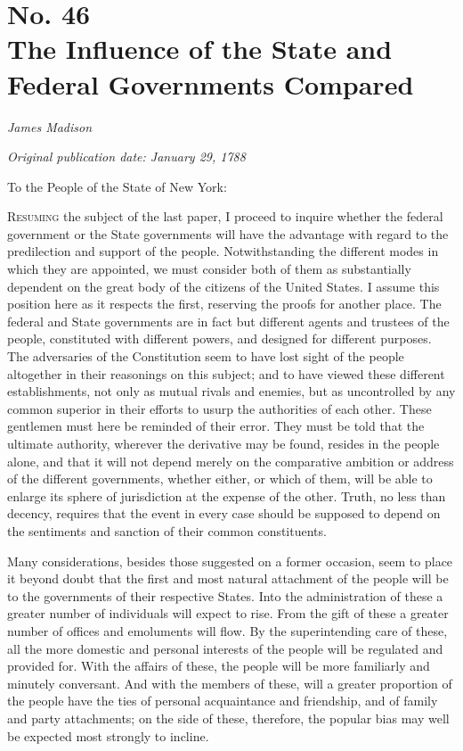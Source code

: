 \chapter[No. 46: The Influence of the State and Federal Governments Compared]{No. 46\\ {\small The Influence of the State and Federal Governments Compared}}

\textit{James Madison}

\textit{Original publication date: January 29, 1788}
\vspace{1cm}

To the People of the State of New York:
\vspace{.4cm}

\textsc{Resuming} the subject of the last paper, I proceed to inquire whether the federal government or the State governments will have the advantage with regard to the predilection and support of the people. 
Notwithstanding the different modes in which they are appointed, we must consider both of them as substantially dependent on the great body of the citizens of the United States. 
I assume this position here as it respects the first, reserving the proofs for another place. 
The federal and State governments are in fact but different agents and trustees of the people, constituted with different powers, and designed for different purposes. 
The adversaries of the Constitution seem to have lost sight of the people altogether in their reasonings on this subject; and to have viewed these different establishments, not only as mutual rivals and enemies, but as uncontrolled by any common superior in their efforts to usurp the authorities of each other. 
These gentlemen must here be reminded of their error. 
They must be told that the ultimate authority, wherever the derivative may be found, resides in the people alone, and that it will not depend merely on the comparative ambition or address of the different governments, whether either, or which of them, will be able to enlarge its sphere of jurisdiction at the expense of the other. 
Truth, no less than decency, requires that the event in every case should be supposed to depend on the sentiments and sanction of their common constituents.

Many considerations, besides those suggested on a former occasion, seem to place it beyond doubt that the first and most natural attachment of the people will be to the governments of their respective States. 
Into the administration of these a greater number of individuals will expect to rise. 
From the gift of these a greater number of offices and emoluments will flow. 
By the superintending care of these, all the more domestic and personal interests of the people will be regulated and provided for. 
With the affairs of these, the people will be more familiarly and minutely conversant. 
And with the members of these, will a greater proportion of the people have the ties of personal acquaintance and friendship, and of family and party attachments; on the side of these, therefore, the popular bias may well be expected most strongly to incline.

